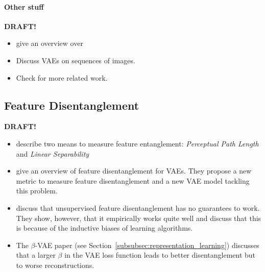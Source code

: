 \paragraph{Other stuff}
\textbf{DRAFT!}
\begin{itemize}
    \item \citet{tschannen2018recent} give an overview over 
    \item Discuss VAEs on sequences of images.
    \item Check \citet{pidhorskyi2020adversarial} for more related work.
\end{itemize}

\subsection{Feature Disentanglement}
\textbf{DRAFT!}
\begin{itemize}
    \item \citet{karras2019style} describe two means to measure feature entanglement: \textit{Perceptual Path Length} and \textit{Linear Separability}
    \item \citet{kim2018disentangling} give an overview of feature disentanglement for \acp{VAE}. They propose a new metric to measure feature disentanglement and a new VAE model tackling this problem.
    \item \citet{Shu2020Weakly} discuss that unsupervised feature disentanglement has no guarantees to work. They show, however, that it empirically works quite well and discuss that this is because of the inductive biases of learning algorithms.
    \item The $\beta$-\ac{VAE} paper (see Section~\ref{subsubsec:representation_learning}) discusses that a larger $\beta$ in the VAE loss function leads to better disentanglement but to worse reconstructions.
\end{itemize}

